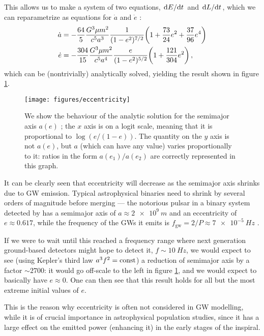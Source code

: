 \documentclass[main.tex]{subfiles}
\begin{document}
This allows us to make a system of two equations, \(\dv*{E}{t}\) and \(\dv*{L}{t}\), which we can reparametrize as equations for \(\dot{a}\) and \(\dot{e}\) \cite[eqs.\ 4.116--17]{maggioreGravitationalWavesVolume2007}: 
%
\begin{align}
\dot{a} &= - \frac{64}{5} \frac{G^3 \mu m^2}{c^{5} a^3}
\frac{1}{(1-e^2)^{7/2}} \qty(1 + \frac{73}{24} e^2 + \frac{37}{96}e^{4})  \\
\dot{e} &= - \frac{304}{15}  \frac{G^3 \mu m^2}{c^{5} a^4} 
\frac{e}{(1-e^2)^{5/2}} \qty(1 + \frac{121}{304} e^2)
\,,
\end{align}
%
which can be (nontrivially) analytically solved, yielding the result shown in figure \ref{fig:eccentricity}. 

\begin{figure}[ht]
\centering
\texttt{[image: figures/eccentricity]}
\caption{We show the behaviour of the analytic solution for the semimajor axis \(a(e)\) \cite[eq.\ 4.126]{maggioreGravitationalWavesVolume2007}; the \(x\) axis is on a logit scale, meaning that it is proportional to \(\log (e / (1-e))\). The quantity on the \(y\) axis is not \(a(e)\), but \(a\) (which can have any value) varies proportionally to it: ratios in the form \(a(e_1) / a(e_2)\) are correctly represented in this graph.}
\label{fig:eccentricity}
\end{figure}

It can be clearly seen that eccentricity will decrease as the semimajor axis shrinks due to \ac{GW} emission.
Typical astrophysical binaries need to shrink by several orders of magnitude before merging --- the notorious pulsar in a binary system detected by \textcite{hulseDiscoveryPulsarBinary1975} has a semimajor axis of \(a \approx \SI{2e9}{m}\) and an eccentricity of \(e \approx 0.617\), while the frequency of the \acsp{GW} it emits is \(f _{\text{gw}} = 2 / P \approx \SI{7e-5}{Hz}\) \cite{taylorNewTestGeneral1982}. 

If we were to wait until this reached a frequency range where next generation ground-based detectors might hope to detect it, \(f \sim \SI{10}{Hz}\), we would expect to see (using Kepler's third law \(a^3 f^2 = \mathrm{const}\)) a reduction of semimajor axis by a factor \(\sim 2700\): it would go off-scale to the left in figure \ref{fig:eccentricity}, and we would expect to basically have \(e \approx 0\). 
One can then see that this result holds for all but the most extreme initial values of \(e\). 

This is the reason why eccentricity is often not considered in \ac{GW} modelling, while it is of crucial importance in astrophysical population studies, since it has a large effect on the emitted power (enhancing it) in the early stages of the inspiral.
\end{document}
